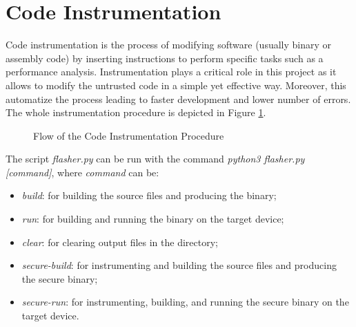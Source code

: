 \section{Code Instrumentation}
\label{sec:project_instrumentation}

Code instrumentation is the process of modifying software (usually binary or assembly
code) by inserting instructions to perform specific tasks such as a performance
analysis. Instrumentation plays a critical role in this project as it allows to modify
the untrusted code in a simple yet effective way. Moreover, this automatize the process
leading to faster development and lower number of errors. The whole
instrumentation procedure is depicted in Figure \ref{fig:instrumentation}.

\begin{figure}[htbp]
  \centering
  \def\stackalignment{r} %
  {\scriptsize }
  \caption{Flow of the Code Instrumentation Procedure}
  \label{fig:instrumentation}
\end{figure}

The script \textit{flasher.py} can be run with the command \textit{python3
flasher.py [command]}, where \textit{command} can be:
\begin{itemize}[noitemsep]
  \item \textit{build}: for building the source files and producing the binary;

  \item \textit{run}: for building and running the binary on the target device;

  \item \textit{clear}: for clearing output files in the directory;

  \item \textit{secure-build}: for instrumenting and building the source files and
    producing the secure binary;

  \item \textit{secure-run}: for instrumenting, building, and running the secure
    binary on the target device.
\end{itemize}

